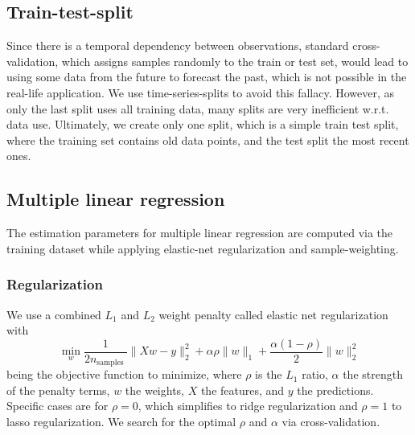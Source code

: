\documentclass[conference]{IEEEtran}
\begin{document}
\subsection{Train-test-split}
Since there is a temporal dependency between observations, standard cross-validation, which assigns samples randomly to the train or test set, would lead to using some data from the future to forecast the past, which is not possible in the real-life application. 
We use time-series-splits to avoid this fallacy. However, as only the last split uses all training data, many splits are very inefficient w.r.t. data use. Ultimately, we create only one split, which is a simple train test split, where the training set contains old data points, and the test split the most recent ones.



\subsection{Multiple linear regression}
The estimation parameters for multiple linear regression are computed via the training dataset while applying elastic-net regularization and sample-weighting.


\subsubsection{Regularization}
We use a combined $L_1$ and $L_2$ weight penalty called elastic net regularization\cite{zou_regularization_2005} with
\begin{equation}
\min _{w} \frac{1}{2 n_{\text {samples }}}\|X w-y\|_{2}^{2}+\alpha \rho\|w\|_{1}+\frac{\alpha(1-\rho)}{2}\|w\|_{2}^{2}
\end{equation}
being the objective function to minimize, where $\rho$ is the $L_1$ ratio, $\alpha$ the strength of the penalty terms, $w$ the weights, $X$ the features, and $y$ the predictions.
Specific cases are for $\rho=0$, which simplifies to ridge regularization and $\rho=1$ to lasso regularization. We search for the optimal $\rho$ and $\alpha$ via cross-validation.
\end{document}
